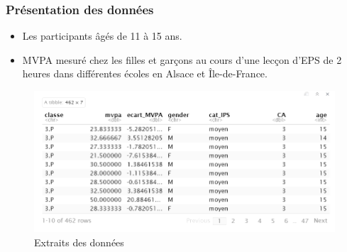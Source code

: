 \documentclass{beamer}
\begin{document}
		\begin{frame}
			\frametitle{Présentation des données} 
			\begin{itemize}
				\item Les participants âgés de 11 à 15 ans.
				\vfill
				\item MVPA mesuré chez les filles et garçons au cours d'une lecçon d'EPS de 2 heures dans différentes écoles en Alsace et Île-de-France.
			\end{itemize}
			\begin{figure}[H]
				\centering
				\includegraphics[width=0.95\linewidth]{Extrai_donnée.PNG}
				\caption{Extraits des données}
				\label{fig:image1}
			\end{figure}
		\end{frame}
\end{document}
